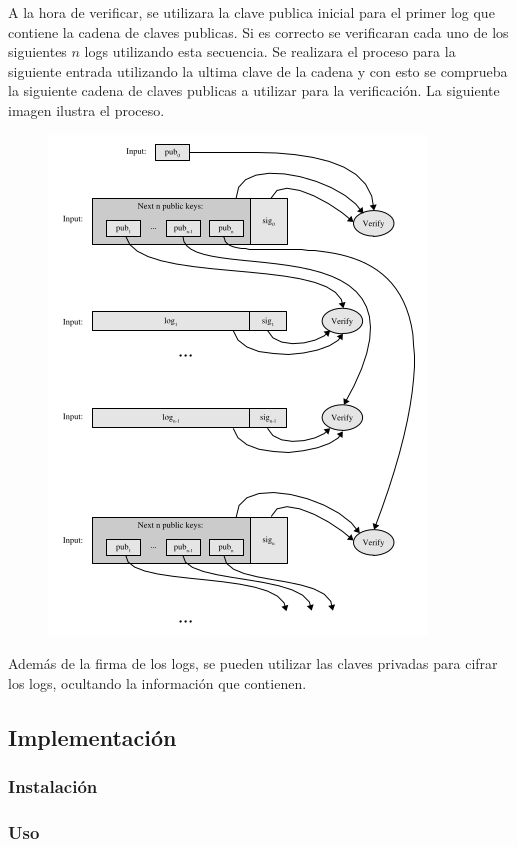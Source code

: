 A la hora de verificar, se utilizara la clave publica inicial para el primer log que contiene la cadena de claves publicas. Si es correcto se verificaran cada uno de los siguientes $n$ logs utilizando esta secuencia. Se realizara el proceso para la siguiente entrada utilizando la ultima clave de la cadena y con esto se comprueba la siguiente cadena de claves publicas a utilizar para la verificación. La siguiente imagen ilustra el proceso.
\begin{figure}[H]
\centering
\includegraphics[scale=0.4]{imagenes/PublicKeyVerification.png}
\end{figure}
  
Además de la firma de los logs, se pueden utilizar las claves privadas para cifrar los logs, ocultando la información que contienen.

\subsection{Implementación}
\subsubsection{Instalación}
\subsubsection{Uso}
